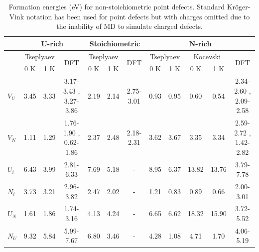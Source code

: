\documentclass[preprint, 12pt]{elsarticle}
\begin{document}
\begin{table}[h!]
\tiny 
\centering
\caption{Formation energies (eV) for non-stoichiometric point defects. Standard Kröger-Vink notation \cite{Kroger1956} has been used for point defects but with charges omitted due to the inability of MD to simulate charged defects.}
\begin{tabular}{l|cc|c|cc|c|cc|cc|c}
\hline
& \multicolumn{3}{c|}{U-rich} & \multicolumn{3}{c|}{Stoichiometric} & \multicolumn{5}{c}{N-rich} \\
\hline
& \multicolumn{2}{c|}{Tseplyaev} & \multirow{2}{*}{DFT} & \multicolumn{2}{c|}{Tseplyaev} & \multirow{2}{*}{DFT} & \multicolumn{2}{c|}{Tseplyaev} & \multicolumn{2}{c|}{Kocevski} & \multirow{2}{*}{DFT} \\
& 0 K & 1 K                &                      & 0 K & 1 K                &                      & 0 K & 1 K                & 0 K & 1 K & \\  
\hline
$V_U$ & 3.45            & 3.33            & 3.17-3.43 \cite{Yang2021}, 3.27-3.86  \cite{Kocevski2022I} & 2.19            & 2.14            & 2.75-3.01 \cite{Yang2021} & 0.93            & 0.95            & 0.60             & 0.54  & 2.34-2.60 \cite{Yang2021}, 2.09-2.58  \cite{Kocevski2022I} \\
$V_N$ & 1.11            & 1.29            & 1.76-1.90 \cite{Yang2021}, 0.62-1.86  \cite{Kocevski2022I} & 2.37            & 2.48            & 2.18-2.31 \cite{Yang2021} & 3.62            & 3.67            & 3.35             & 3.34  & 2.59-2.72 \cite{Yang2021}, 1.42-2.82  \cite{Kocevski2022I} \\
$U_i$ & 6.43            & 3.99            & 2.81-6.33 \cite{Kocevski2022I}                             & 7.69            & 5.18            & -                         & 8.95            & 6.37            & 13.82            & 13.76 & 3.79-7.78  \cite{Kocevski2022I} \\
$N_i$ & 3.73            & 3.21            & 2.96-3.82 \cite{Kocevski2022I}                             & 2.47            & 2.02            & -                         & 1.21            & 0.83            & 0.89             & 0.66  & 2.00-3.01  \cite{Kocevski2022I} \\
$U_N$ & 1.61            & 1.86            & 1.74-3.16 \cite{Kocevski2022I}                             & 4.13            & 4.24            & -                         & 6.65            & 6.62            & 18.32            & 15.90 & 3.72-5.52  \cite{Kocevski2022I} \\
$N_U$ & 9.32            & 5.84            & 5.99-7.67 \cite{Kocevski2022I}                             & 6.80            & 3.46            & -                         & 4.28            & 1.08            & 4.71             & 1.70  & 4.06-5.19  \cite{Kocevski2022I} \\
\hline
\end{tabular}
\label{Tab:Ef}
\end{table}
\end{document}
